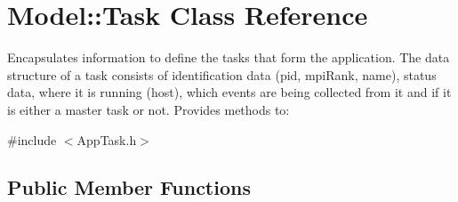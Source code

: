 \hypertarget{class_model_1_1_task}{\section{Model\-:\-:Task Class Reference}
\label{class_model_1_1_task}
}


Encapsulates information to define the tasks that form the application. The data structure of a task consists of identification data (pid, mpi\-Rank, name), status data, where it is running (host), which events are being collected from it and if it is either a master task or not. Provides methods to\-:  




{\ttfamily \#include $<$App\-Task.\-h$>$}

\subsection*{Public Member Functions}
